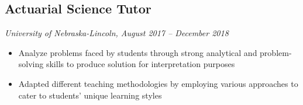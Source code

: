 \documentclass{cv_style}
\begin{document}
	  \subsection{Actuarial Science Tutor}\textit{University of Nebraska-Lincoln, August 2017 – December 2018}
	      \begin{itemize}
	        \item Analyze problems faced by students through strong analytical and problem-solving skills to produce solution for interpretation purposes
			    \item Adapted different teaching methodologies by employing various approaches to cater to students’ unique learning styles
			  \end{itemize}
\end{document}
